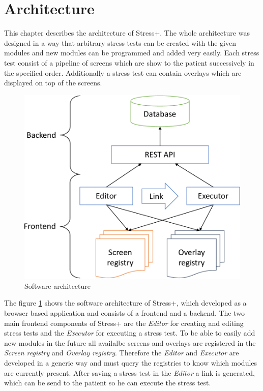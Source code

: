 \section{Architecture}

This chapter describes the architecture of Stress+.
The whole architecture was designed in a way that arbitrary stress tests can be created with the given modules and new modules can be programmed and added very easily.
Each stress test consist of a pipeline of screens which are show to the patient successively in the specified order.
Additionally a stress test can contain overlays which are displayed on top of the screens.

\begin{figure}[htb]
  \centering
  \includegraphics[width=\textwidth]{figures/Architecture-crop}
  \caption{Software architecture}
  \label{fig:software-architecture}
\end{figure}

The figure \ref{fig:software-architecture} shows the software architecture of Stress+, which developed as a browser based application and consists of a frontend and a backend.
The two main frontend components of Stress+ are the \textit{Editor} for creating and editing stress tests and the \textit{Executor} for executing a stress test.
To be able to easily add new modules in the future all availalbe screens and overlays are registered in the \textit{Screen registry} and \textit{Overlay registry}. 
Therefore the \textit{Editor} and \textit{Executor} are developed in a generic way and must query the registries to know which modules are currently present.
After saving a stress test in the \textit{Editor} a link is generated, which can be send to the patient so he can execute the stress test.

